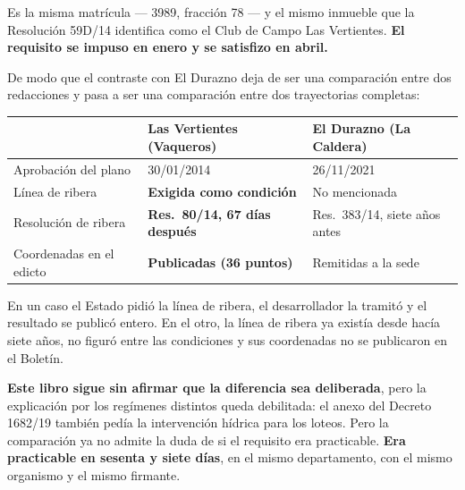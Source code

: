 \begin{cautela}

Es la misma matrícula --- 3989, fracción 78 --- y el mismo inmueble que la Resolución 59D/14 identifica como el Club de Campo Las Vertientes. \textbf{El requisito se impuso en enero y se satisfizo en abril.}

De modo que el contraste con El Durazno deja de ser una comparación entre dos redacciones y pasa a ser una comparación entre dos trayectorias completas:

\begin{center}\small
\begin{tabular}{@{}p{3.2cm}p{4.3cm}p{4.3cm}@{}}
\toprule
& \textbf{Las Vertientes} (Vaqueros) & \textbf{El Durazno} (La Caldera) \\
\midrule
Aprobación del plano & 30/01/2014 & 26/11/2021 \\
Línea de ribera & \textbf{Exigida como condición} & No mencionada \\
Resolución de ribera & \textbf{Res.\ 80/14, 67 días después} & Res.\ 383/14, siete años antes \\
Coordenadas en el edicto & \textbf{Publicadas (36 puntos)} & Remitidas a la sede \\
\bottomrule
\end{tabular}
\end{center}

En un caso el Estado pidió la línea de ribera, el desarrollador la tramitó y el resultado se publicó entero. En el otro, la línea de ribera ya existía desde hacía siete años, no figuró entre las condiciones y sus coordenadas no se publicaron en el Boletín.

\textbf{Este libro sigue sin afirmar que la diferencia sea deliberada}, pero la explicación por los regímenes distintos queda debilitada: el anexo del Decreto 1682/19 también pedía la intervención hídrica para los loteos. Pero la comparación ya no admite la duda de si el requisito era practicable. \textbf{Era practicable en sesenta y siete días}, en el mismo departamento, con el mismo organismo y el mismo firmante.
\end{cautela}

